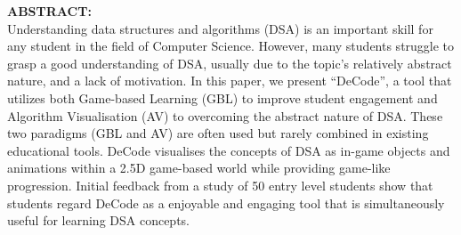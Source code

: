 \documentclass[11pt]{article}
\begin{document}


\noindent \textbf{ABSTRACT:}\\
Understanding data structures and algorithms (DSA) is an important skill for any student in the field of Computer Science. However, many students struggle to grasp a good understanding of DSA, usually due to the topic's relatively abstract nature, and a lack of motivation. In this paper, we present ``DeCode'', a tool that utilizes both Game-based Learning (GBL) to improve student engagement and Algorithm Visualisation (AV) to overcoming the abstract nature of DSA. These two paradigms (GBL and AV) are often used but rarely combined in existing educational tools. DeCode visualises the concepts of DSA as in-game objects and animations within a 2.5D game-based world while providing game-like progression. Initial feedback from a study of 50 entry level students show that students regard DeCode as a enjoyable and engaging tool that is simultaneously useful for learning DSA concepts.

\listoffigures
\listoftables
\newpage
\end{document}
